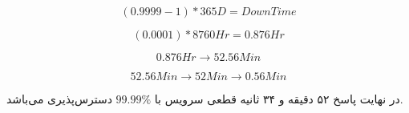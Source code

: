 \documentclass[a4paper]{article}
\begin{document}
\begin{equation}
    (0.9999 - 1) * 365D = Down Time
\end{equation}

\begin{equation}
    (0.0001) * 8760Hr = 0.876Hr
\end{equation}

\begin{equation}
    0.876Hr \rightarrow 52.56Min
\end{equation}

\begin{equation}
    52.56Min \rightarrow 52 Min \rightarrow 0.56Min
\end{equation}

در نهایت پاسخ ۵۲ دقیقه و ۳۴ ثانیه قطعی سرویس با $99.99\%$ دسترس‌پذیری می‌باشد.

\newpage


\end{document}
